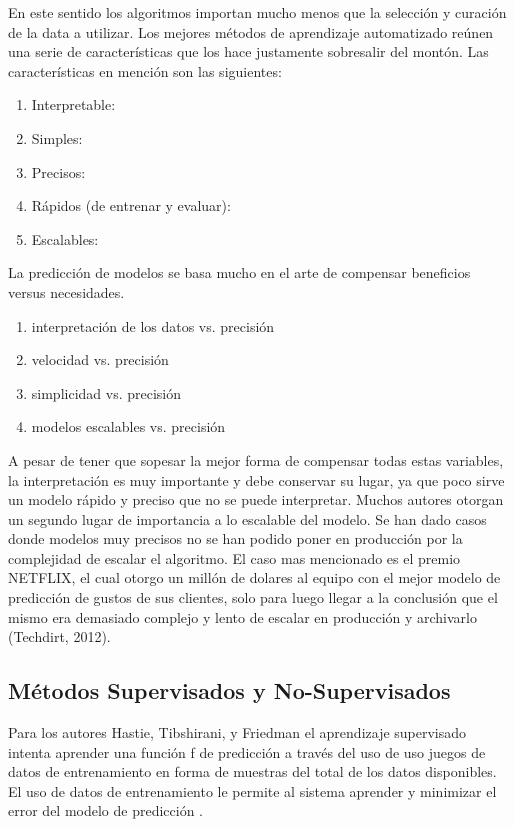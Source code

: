 En este sentido los algoritmos importan mucho menos que la selección y curación de la data a utilizar. Los mejores métodos de aprendizaje automatizado reúnen una serie de características que los hace justamente sobresalir del montón. Las características en mención son las siguientes:

\begin{enumerate}
	\item Interpretable:
	\item Simples:
	\item Precisos:
	\item Rápidos (de entrenar y evaluar):
	\item Escalables:
\end{enumerate}

La predicción de modelos se basa mucho en el arte de compensar beneficios versus necesidades.

\begin{enumerate}
	\item interpretación de los datos vs. precisión
	\item velocidad vs. precisión
	\item simplicidad vs. precisión
	\item modelos escalables vs. precisión
\end{enumerate}

A pesar de tener que sopesar la mejor forma de compensar todas estas variables, la interpretación es muy importante y debe conservar su lugar, ya que poco sirve un modelo rápido y preciso que no se puede interpretar. Muchos autores otorgan un segundo lugar de importancia a lo escalable del modelo. Se han dado casos donde modelos muy precisos no se han podido poner en producción por la complejidad de escalar el algoritmo. El caso mas mencionado es el premio NETFLIX, el cual otorgo un millón de dolares al equipo con el mejor modelo de predicción de gustos de sus clientes, solo para luego llegar a la conclusión que el mismo era demasiado complejo y lento de escalar en producción y archivarlo (Techdirt, 2012).

\subsection{Métodos Supervisados y No-Supervisados}
Para los autores Hastie, Tibshirani, y Friedman el aprendizaje supervisado intenta aprender una función f de predicción a través del uso de uso juegos de datos de entrenamiento en forma de muestras del total de los datos disponibles. El uso de datos de entrenamiento le permite al sistema aprender y minimizar el error del modelo de predicción \cite{theElements}.

